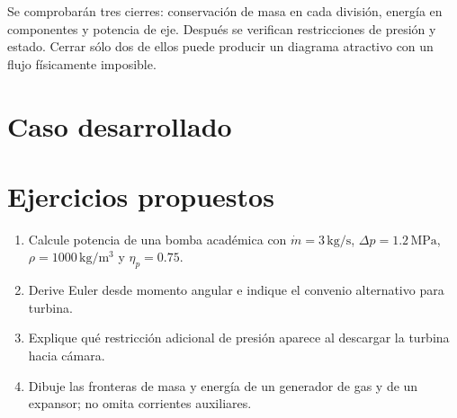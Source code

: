 Se comprobarán tres cierres: conservación de masa en cada división, energía en componentes y potencia de eje. Después se verifican restricciones de presión y estado. Cerrar sólo dos de ellos puede producir un diagrama atractivo con un flujo físicamente imposible.
\section{Caso desarrollado}

\section{Ejercicios propuestos}
\begin{enumerate}
\item Calcule potencia de una bomba académica con $\dot m=3\,\mathrm{kg/s}$, $\Delta p=1.2\,\mathrm{MPa}$, $\rho=1000\,\mathrm{kg/m^3}$ y $\eta_p=0.75$.
\item Derive Euler desde momento angular e indique el convenio alternativo para turbina.
\item Explique qué restricción adicional de presión aparece al descargar la turbina hacia cámara.
\item Dibuje las fronteras de masa y energía de un generador de gas y de un expansor; no omita corrientes auxiliares.
\end{enumerate}


\studiumchaptercheck
